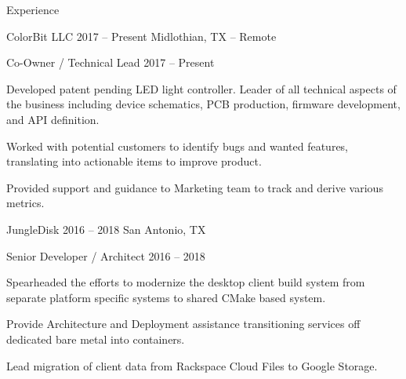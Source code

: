 \documentclass{resume}
\begin{document}
\begin{rSection}{Experience}
        \begin{rSubsection}{ColorBit LLC}
            {2017 -- Present} %
            {Midlothian, TX -- Remote} %
            \begin{rSubsubsection}{Co-Owner / Technical Lead}
                {2017 -- Present} %
            \item Developed patent pending LED light controller. Leader of all technical
                aspects of the business including device schematics, PCB production,
                firmware development, and API definition.
            \item Worked with potential customers to identify bugs and wanted features,
                translating into actionable items to improve product.
            \item Provided support and guidance to Marketing team to track and derive
                various metrics.
            \end{rSubsubsection}
        \end{rSubsection}

        \begin{rSubsection}{JungleDisk}
            {2016 -- 2018} %
            {San Antonio, TX}
            \begin{rSubsubsection}{Senior Developer / Architect}
                {2016 -- 2018} %
            \item Spearheaded the efforts to modernize the desktop client build system
                from separate platform specific systems to shared CMake based system.
            \item Provide Architecture and Deployment assistance transitioning services
                off dedicated bare metal into containers.
            \item Lead migration of client data from Rackspace Cloud Files to Google
                Storage.
            \end{rSubsubsection}
        \end{rSubsection}


\end{rSection}
\end{document}
